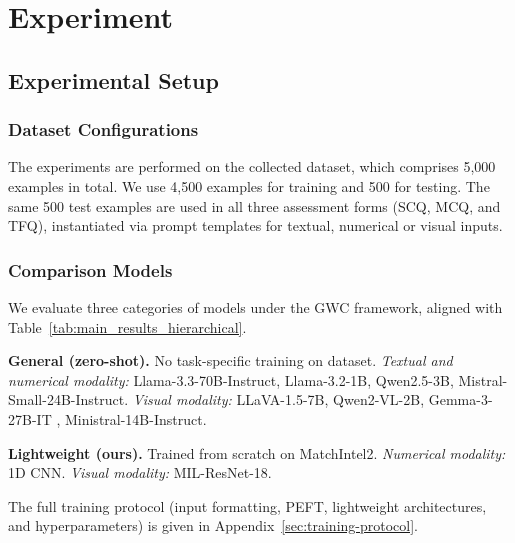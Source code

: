 \section{Experiment}
\label{sec:experiment}
\subsection{Experimental Setup}
\subsubsection{Dataset Configurations}
The experiments are performed on the collected dataset, which comprises 5,000 examples in total. We use 4,500 examples for training and 500 for testing. The same 500 test examples are used in all three assessment forms (SCQ, MCQ, and TFQ), instantiated via prompt templates for textual, numerical or visual inputs.

\subsubsection{Comparison Models}
We evaluate three categories of models under the GWC framework, aligned with Table~\ref{tab:main_results_hierarchical}.

\textbf{General (zero-shot).} No task-specific training on dataset. \textit{Textual and numerical modality:} Llama-3.3-70B-Instruct, Llama-3.2-1B, Qwen2.5-3B, Mistral-Small-24B-Instruct. \textit{Visual modality:} LLaVA-1.5-7B, Qwen2-VL-2B, Gemma-3-27B-IT \cite{team2023gemini}, Ministral-14B-Instruct.

\textbf{Lightweight (ours).} Trained from scratch on MatchIntel2. \textit{Numerical modality:} 1D CNN. \textit{Visual modality:} MIL-ResNet-18.

The full training protocol (input formatting, PEFT, lightweight architectures, and hyperparameters) is given in Appendix~\ref{sec:training-protocol}.



